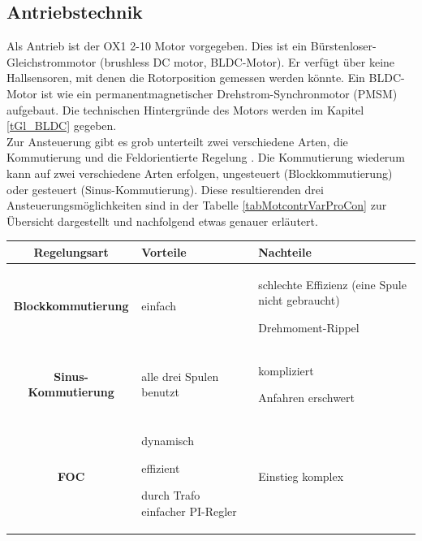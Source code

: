 \subsection*{Antriebstechnik}
Als Antrieb ist der OX1 2-10 Motor vorgegeben. Dies ist ein Bürstenloser-Gleichstrommotor (brushless DC motor, BLDC-Motor). Er verfügt über keine Hallsensoren, mit denen die Rotorposition gemessen werden könnte. Ein BLDC-Motor ist wie ein permanentmagnetischer Drehstrom-Synchronmotor (PMSM) aufgebaut. Die technischen Hintergründe des Motors werden im Kapitel \ref{tGl_BLDC} gegeben. 
\\
Zur Ansteuerung gibt es grob unterteilt zwei verschiedene Arten, die Kommutierung und die Feldorientierte Regelung \cite{BLDC}. Die Kommutierung wiederum kann auf zwei verschiedene Arten erfolgen, ungesteuert (Blockkommutierung) oder gesteuert (Sinus-Kommutierung). Diese resultierenden drei Ansteuerungsmöglichkeiten sind in der Tabelle \ref{tabMotcontrVarProCon} zur Übersicht dargestellt und nachfolgend etwas genauer erläutert. 
\begin{center}
	\begin{tabularx}{\textwidth}{|c|X|X|}
		\hline 
		\textbf{Regelungsart} & \textbf{Vorteile} & \textbf{Nachteile} \\ 
		\hline 
		\textbf{Blockkommutierung} & einfach & schlechte Effizienz (eine Spule nicht gebraucht) 
		
		Drehmoment-Rippel \\
		\hline 
		\textbf{Sinus-Kommutierung} & alle drei Spulen benutzt & kompliziert
		
		Anfahren erschwert \\ 
		\hline 
		\textbf{FOC} & dynamisch 
		
		effizient 
		
		durch Trafo einfacher PI-Regler & Einstieg komplex \\ 
		\hline 
	\end{tabularx} 
	\label{tabMotcontrVarProCon}
\end{center}


